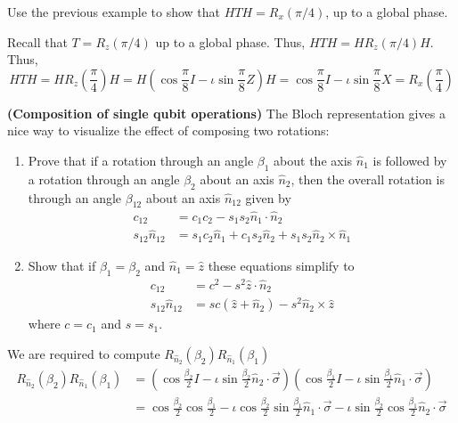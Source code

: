 \begin{example}
    Use the previous example to show that $HTH=R_x(\pi/4)$, up to a global phase.

    Recall that $T=R_z(\pi/4)$ up to a global phase. Thus, $HTH=HR_z(\pi/4)H$. Thus,
    \[
    HTH=HR_z\left(\frac{\pi}{4}\right)H=H\left(\cos\frac{\pi}{8} I - \iota\sin \frac{\pi}{8}Z\right)H=\cos\frac{\pi}{8} I- \iota\sin\frac{\pi}{8}X=R_x\left(\frac{\pi}{4}\right)
    \]
    \begin{example}
        \textbf{(Composition of single qubit operations)} The Bloch representation gives a nice way to visualize the effect of composing two rotations:
        \begin{enumerate}
            \item Prove that if a rotation through an angle $\beta_1$ about the axis $\hat{n}_1$ is followed by a rotation through an angle $\beta_2$ about an axis $\hat{n}_2$, then the overall rotation is through an angle $\beta_{12}$ about an axis $\hat{n}_{12}$ given by
            \begin{align*}
            c_{12}&=c_1c_2-s_1s_2\hat{n}_1 \cdot \hat{n}_2\\
            s_{12}\hat{n}_{12} &= s_1c_2\hat{n}_1 + c_1s_2\hat{n}_2 +s_1s_2\hat{n}_2 \times \hat{n}_1
            \end{align*}
            \item Show that if $\beta_1=\beta_2$ and $\hat{n}_1=\hat{z}$ these equations simplify to
            \begin{align*}
            c_{12}&=c^2-s^2\hat{z}\cdot\hat{n}_2\\
            s_{12}\hat{n}_{12}&=sc(\hat{z}+\hat{n}_2)-s^2\hat{n}_2\times \hat{z}
            \end{align*}
            where $c=c_1$ and $s=s_1$.
        \end{enumerate}
    \end{example}
    We are required to compute $R_{\hat{n}_2}(\beta_2)R_{\hat{n}_1}(\beta_1)$
    \begin{align*}
        R_{\hat{n}_2}(\beta_2)R_{\hat{n}_1}(\beta_1)&=\left(\cos \frac{\beta_2}{2} I -\iota \sin \frac{\beta_2}{2} \hat{n}_2 \cdot \vec{\sigma}\right) \left(\cos\frac{\beta_1}{2} I -\iota \sin \frac{\beta_1}{2} \hat{n}_1\cdot \vec{\sigma} \right)\\
        &=\cos \frac{\beta_2}{2} \cos \frac{\beta_1}{2} - \iota \cos \frac{\beta_2}{2}\sin\frac{\beta_1}{2} \hat{n}_1\cdot \vec{\sigma} - \iota \sin \frac{\beta_2}{2} \cos \frac{\beta_1}{2} \hat{n}_2\cdot \vec{\sigma} \\

\end{align*}
\end{example}
